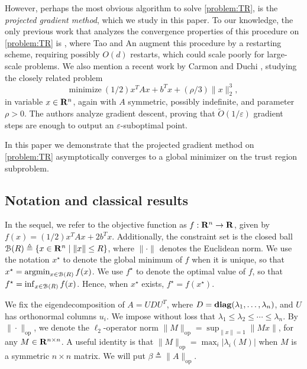 \documentclass[11pt]{article}
\let\epsilon\varepsilon
\begin{document}
However, perhaps the most obvious algorithm to solve \eqref{problem:TR}, is the
\emph{projected gradient method}, which we study in this paper. To our knowledge, the only previous work 
that analyzes the convergence properties of this procedure on 
\eqref{problem:TR} is \cite{tao1998}, where Tao and An augment this procedure by a restarting scheme, requiring 
possibly $O(d)$ restarts, which could scale poorly for large-scale problems. 
We also mention a recent work by Carmon and Duchi \cite{carmon2016}, studying the closely related problem
\begin{equation}\label{problem:QP}
\text{minimize}~ (1/2)x^T A x + b^Tx + (\rho/3) \|x\|_2^3,
\end{equation}
in variable $x \in \mathbf{R}^n$, again with $A$ symmetric, possibly indefinite, and parameter $\rho > 0$. The 
authors analyze gradient descent, proving that $\tilde O(1/\epsilon)$ gradient steps are enough to output an $\epsilon$-suboptimal point.

In this paper we demonstrate that the projected gradient method on \eqref{problem:TR} 
asymptotically converges to a global minimizer on the trust region subproblem.


\subsection{Notation and classical results}
In the sequel, we refer to the objective function as $f: \mathbf{R}^n \to \mathbf{R}$, given by $f(x) = (1/2)x^T Ax + 2b^T x$.
Additionally, the constraint set is the closed ball
$\mathcal{B}(R) \triangleq \{x \in \mathbf{R}^n \mid \|x\| \leq R\}$, 
where $\|\cdot\|$ denotes the Euclidean norm. We use the notation $x^\star$ to denote the global minimum of $f$ when it is unique,
so that $x^\star = \mathop{\rm argmin}_{x \in \mathcal{B}(R)} f(x)$. We use $f^\star$ to denote the optimal value of $f$, so that
$f^\star = \inf_{x \in \mathcal{B}(R)} f(x)$. Hence, when $x^\star$ exists, $f^\star = f(x^\star)$. 

We fix the eigendecomposition of $A = UDU^T$, where $D = \mathop{\bf diag}(\lambda_1, \dots, \lambda_n)$, and $U$ has orthonormal
columns $u_i$. We impose without loss that $\lambda_1 \leq \lambda_2 \leq \cdots \leq \lambda_n$. 
By $\|\cdot\|_\mathrm{op}$, we denote the $\ell_2$-operator norm 
$\|M\|_\mathrm{op} = \sup_{\|x\| = 1} 
\|Mx\|$, for any $M \in \mathbf{R}^{n \times n}$. 
A useful identity is that 
$\|M\|_\mathrm{op} = \max_i |\lambda_i(M)|$ when 
$M$ is a symmetric $n \times n$ matrix. We will put $\beta \triangleq \|A\|_{\mathrm{op}}$.
\end{document}
